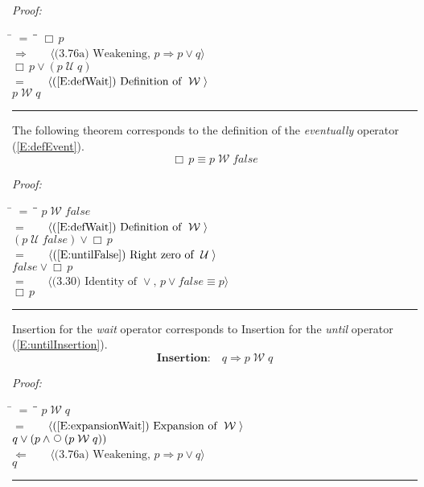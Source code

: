 \documentclass[fleqn, leqno]{article}
\newcommand{\lgap}{2pt}                             %
\newcommand{\mymathindent}{24pt}                    %
\newcommand{\impl}{\ensuremath{\Rightarrow}}        %
\newcommand{\foll}{\ensuremath{\Leftarrow}}         %
\newcommand{\Until}{\;\mathcal{U}\;}
\newcommand{\Wait}{\;\mathcal{W}\;}
\newcommand{\Next}{\;\,\text{\raisebox{3.5pt}{\circle{6}}}}
\newcommand{\Always}{\Box\,}
\newcommand{\myqed}{\rule[-.23ex]{1.2ex}{2.0ex}}
\newcommand{\myqedtab}{\hspace{388.5pt}}              %
\newcommand{\Gll} {\langle}                         %
\newcommand{\Ggg} {\rangle}                         %
\newcommand{\Hint}[1]     {\ \ \ $\Gll              \mbox{#1} \Ggg$ }   %
\begin{document}
\emph{Proof:}
\begin{tabbing}
\hspace{\mymathindent} \= $= \;$ \= \myqedtab \= \kill
\> \> $\Always p$\\[\lgap]
\> $\impl$ \> \Hint{(3.76a) Weakening, $p\impl p\lor q$} \\[\lgap]
\> \> $\Always p \lor (p \Until q)$\\[\lgap]
\> $=$ \> \Hint{(\ref{E:defWait}) Definition of $\Wait$} \\[\lgap]
\> \> $p \Wait q$ \> \myqed
\end{tabbing}

The following theorem corresponds to the definition of the \textit{eventually} operator (\ref{E:defEvent}).
\begin{equation}\label{E:alwaysAsWait}
\Always p \equiv p \Wait false
\end{equation}

\emph{Proof:}
\begin{tabbing}
\hspace{\mymathindent} \= $= \;$ \= \myqedtab \= \kill
\> \> $p \Wait false$\\[\lgap]
\> $=$ \> \Hint{(\ref{E:defWait}) Definition of $\Wait$} \\[\lgap]
\> \> $(p \Until false) \lor \Always p$\\[\lgap]
\> $=$ \> \Hint{(\ref{E:untilFalse}) Right zero of $\Until$} \\[\lgap]
\> \> $false \lor \Always p$\\[\lgap]
\> $=$ \> \Hint{(3.30) Identity of $\lor$, $p\lor false\equiv p$} \\[\lgap]
\> \> $\Always p$ \> \myqed
\end{tabbing}

Insertion for the \textit{wait} operator corresponds to
Insertion for the \textit{until} operator (\ref{E:untilInsertion}).
\begin{equation}\label{E:waitInsertion}
\textbf{Insertion:}\quad q \impl p \Wait q
\end{equation}

\emph{Proof:}
\begin{tabbing}
\hspace{\mymathindent} \= $= \;$ \= \myqedtab \= \kill
\> \> $p \Wait q$\\[\lgap]
\> $=$ \> \Hint{(\ref{E:expansionWait}) Expansion of $\Wait$} \\[\lgap]
\> \> $q \lor (p \land \Next(p \Wait q))$\\[\lgap]
\> $\foll$ \> \Hint{(3.76a) Weakening, $p\impl p\lor q$} \\[\lgap]
\> \> $q$ \> \myqed
\end{tabbing}
\end{document}
